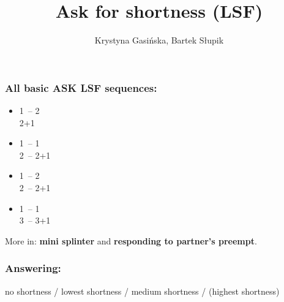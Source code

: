 \documentclass[12pt, a4paper]{article}
\title{Ask for shortness (LSF)}
\author{Krystyna Gasińska, Bartek Słupik}
\begin{document}
\maketitle


\subsubsection*{All basic ASK LSF sequences:}
\begin{itemize}
    \item 1\majs\ -- 2\majs\ \\ 2\majs+1\alrts
    \item 1\minor\ -- 1\majs\ \\ 2\majs\ -- 2\majs+1\alrts
    \item 1\majs\ -- 2 \\ 2\majs\ -- 2\majs+1\alrts
    \item 1\minor\ -- 1\majs \\ 3\majs\ -- 3\majs+1\alrts
\end{itemize}

More in: \textbf{mini splinter} and \textbf{responding to partner's preempt}.

\subsubsection*{Answering:}

no shortness / lowest shortness / medium shortness / (highest shortness)

\end{document}
